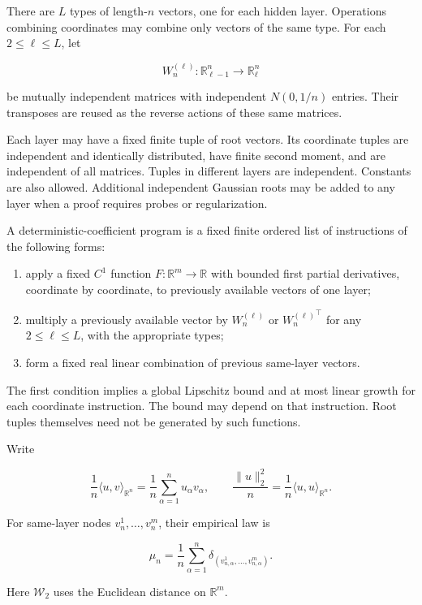 \documentclass[
  11pt,
]{article}
\providecommand{\tightlist}{%
  \setlength{\itemsep}{0pt}\setlength{\parskip}{0pt}}
\theoremstyle{definition}
\theoremstyle{plain}
\theoremstyle{plain}
\theoremstyle{plain}
\theoremstyle{remark}
\begin{document}
There are \(L\) types of length-\(n\) vectors, one for each hidden
layer. Operations combining coordinates may combine only vectors of the
same type. For each \(2\le\ell\le L\), let

\[
 W^{(\ell)}_n:\mathbb R^n_{\ell-1}\longrightarrow\mathbb R^n_\ell
\]

be mutually independent matrices with independent \(N(0,1/n)\) entries.
Their transposes are reused as the reverse actions of these same
matrices.

Each layer may have a fixed finite tuple of root vectors. Its coordinate
tuples are independent and identically distributed, have finite second
moment, and are independent of all matrices. Tuples in different layers
are independent. Constants are also allowed. Additional independent
Gaussian roots may be added to any layer when a proof requires probes or
regularization.

A deterministic-coefficient program is a fixed finite ordered list of
instructions of the following forms:

\begin{enumerate}
\def\labelenumi{\arabic{enumi}.}
\tightlist
\item
  apply a fixed \(C^1\) function \(F:\mathbb R^m\to\mathbb R\) with
  bounded first partial derivatives, coordinate by coordinate, to
  previously available vectors of one layer;
\item
  multiply a previously available vector by \(W^{(\ell)}_n\) or
  \({W^{(\ell)}_n}^{\top}\) for any \(2\le\ell\le L\), with the
  appropriate types;
\item
  form a fixed real linear combination of previous same-layer vectors.
\end{enumerate}

The first condition implies a global Lipschitz bound and at most linear
growth for each coordinate instruction. The bound may depend on that
instruction. Root tuples themselves need not be generated by such
functions.

Write

\[
\frac{1}{n}\langle u,v\rangle_{\mathbb R^n}=\frac1n\sum_{\alpha=1}^n u_\alpha v_\alpha,
\qquad \frac{\|u\|_2^2}{n}=\frac{1}{n}\langle u,u\rangle_{\mathbb R^n}.
\]

For same-layer nodes \(v^1_n,\ldots,v^m_n\), their empirical law is

\[
\widehat\mu_n=\frac1n\sum_{\alpha=1}^n
 \delta_{(v^1_{n,\alpha},\ldots,v^m_{n,\alpha})}.
\]

Here \(\mathcal W_2\) uses the Euclidean distance on \(\mathbb R^m\).
\end{document}
